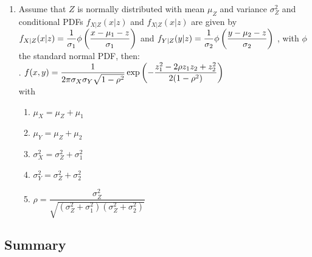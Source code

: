 \begin{enumerate}
    \item Assume that $Z$ is normally distributed with mean $\mu_Z$ and variance $\sigma^2_Z$ and conditional PDFs $f_{X|Z} (x|z)$ and $f_{X|Z} (x|z)$ are given by $f_{X|Z} (x|z) = \dfrac{1}{\sigma_1} \phi\left(\dfrac{x - \mu_1 - z}{\sigma_1}\right)$ and $f_{Y |Z} (y|z) = \dfrac{1}{\sigma_2} \phi\left(\dfrac{y - \mu_2 - z}{\sigma_2}\right)$ , with $\phi$ the standard normal PDF, then:
    \hfill \cite{statistics/book/Statistics-for-Data-Scientists/Maurits-Kaptein}
    \\
    .\hfill
    $
        f (x, y)
        = \dfrac{1}{ 2\pi\sigma_X \sigma_Y \sqrt{1 - \rho^2} }
        \exp \left(
            - \dfrac{z^2_1 - 2\rho z_1z_2 + z^2_2 }{2(1 - \rho^2)}
        \right)
    $
    \hfill \cite{statistics/book/Statistics-for-Data-Scientists/Maurits-Kaptein}
    \\
    with
    \begin{multicols}{2}
    \begin{enumerate}
        \item $\mu_X = \mu_Z + \mu_1$
        \hfill \cite{statistics/book/Statistics-for-Data-Scientists/Maurits-Kaptein}

        \item $\mu_Y = \mu_Z + \mu_2$
        \hfill \cite{statistics/book/Statistics-for-Data-Scientists/Maurits-Kaptein}

        \item $\sigma^2_X = \sigma^2_Z + \sigma^2_1$
        \hfill \cite{statistics/book/Statistics-for-Data-Scientists/Maurits-Kaptein}

        \item $\sigma^2_Y = \sigma^2_Z + \sigma^2_2$
        \hfill \cite{statistics/book/Statistics-for-Data-Scientists/Maurits-Kaptein}

        \item $\rho = \dfrac{\sigma^2_Z }{\sqrt{(\sigma^2_Z + \sigma^2_1 )(\sigma^2_Z + \sigma^2_2 )}}$
        \hfill \cite{statistics/book/Statistics-for-Data-Scientists/Maurits-Kaptein}
    \end{enumerate}
    \end{multicols}
\end{enumerate}












\subsection{Summary}

